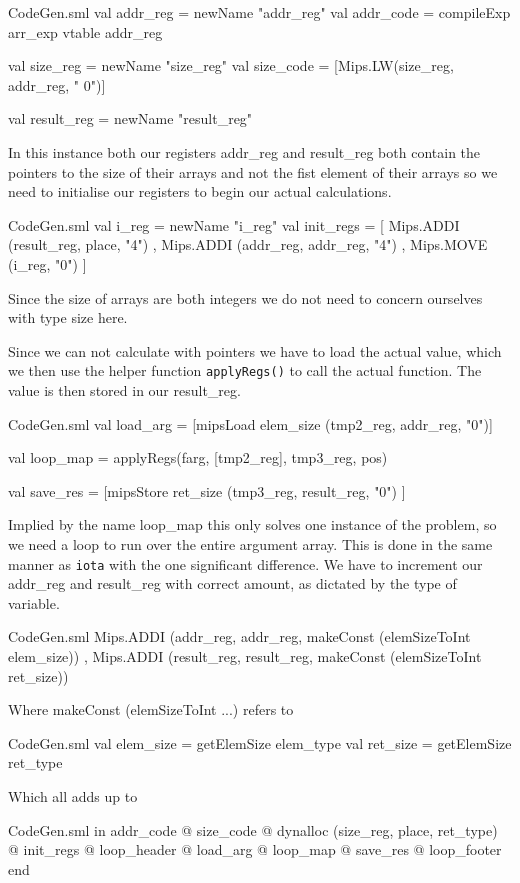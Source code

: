 \documentclass[11pt,a4paper,oneside]{report}
\begin{document}
\begin{code}[firstnumber=538]{CodeGen.sml}
        val addr_reg  = newName "addr_reg"
        val addr_code = compileExp arr_exp vtable addr_reg

        val size_reg  = newName "size_reg"
        val size_code = [Mips.LW(size_reg, addr_reg, " 0")]

        val result_reg = newName "result_reg"
\end{code}

In this instance both our registers addr\_reg and result\_reg both contain the pointers to the size of their arrays and not the fist element of their arrays so we need to initialise our registers to begin our actual calculations.
\begin{code}[firstnumber=546]{CodeGen.sml}
        val i_reg = newName "i_reg"
          val init_regs = [ Mips.ADDI (result_reg, place, "4")
                          , Mips.ADDI (addr_reg, addr_reg, "4")
                          , Mips.MOVE (i_reg, "0") ]
\end{code}

Since the size of arrays are both integers we do not need to concern ourselves with type size here.

Since we can not calculate with pointers we have to load the actual value, which we then use the helper function \texttt{applyRegs()} to call the actual function. The value is then stored in our result\_reg.
\begin{code}[firstnumber=561]{CodeGen.sml}
        val load_arg = [mipsLoad elem_size (tmp2_reg, addr_reg, "0")]

        val loop_map = applyRegs(farg, [tmp2_reg], tmp3_reg, pos)

        val save_res = [mipsStore ret_size (tmp3_reg, result_reg, "0") ]
\end{code}
Implied by the name loop\_map this only solves one instance of the problem, so we need a loop to run over the entire argument array. This is done in the same manner as \texttt{iota} with the one significant difference. We have to increment our addr\_reg and result\_reg with correct amount, as dictated by the type of variable.

\begin{code}[firstnumber=567]{CodeGen.sml}
  Mips.ADDI (addr_reg, addr_reg, makeConst (elemSizeToInt elem_size))
, Mips.ADDI (result_reg, result_reg, makeConst (elemSizeToInt ret_size))
\end{code}
Where makeConst (elemSizeToInt ...) refers to
\begin{code}[firstnumber=535]{CodeGen.sml}
val elem_size = getElemSize elem_type
val ret_size  = getElemSize ret_type
\end{code}
\newpage
Which all adds up to
\begin{code}[firstnumber=573]{CodeGen.sml}
in addr_code
          @ size_code
          @ dynalloc (size_reg, place, ret_type)
          @ init_regs
          @ loop_header
          @ load_arg
          @ loop_map
          @ save_res
          @ loop_footer
        end
\end{code}
\end{document}
